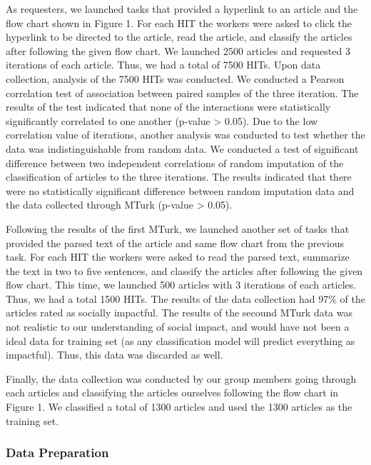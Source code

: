 \documentclass[10pt,letterpaper]{article}
\begin{document}
As requesters, we launched tasks that provided a hyperlink to an article
and the flow chart shown in Figure 1. For each HIT the workers were
asked to click the hyperlink to be directed to the article, read the
article, and classify the articles after following the given flow chart.
We launched 2500 articles and requested 3 iterations of each article.
Thus, we had a total of 7500 HITs. Upon data collection, analysis of the
7500 HITs was conducted. We conducted a Pearson correlation test of
association between paired samples of the three iteration. The results
of the test indicated that none of the interactions were statistically
significantly correlated to one another (p-value \textgreater{} 0.05).
Due to the low correlation value of iterations, another analysis was
conducted to test whether the data was indistinguishable from random
data. We conducted a test of significant difference between two
independent correlations of random imputation of the classification of
articles to the three iterations. The results indicated that there were
no statistically significant difference between random imputation data
and the data collected through MTurk (p-value \textgreater{} 0.05).

Following the results of the first MTurk, we launched another set of
tasks that provided the parsed text of the article and same flow chart
from the previous task. For each HIT the workers were asked to read the
parsed text, summarize the text in two to five sentences, and classify
the articles after following the given flow chart. This time, we
launched 500 articles with 3 iterations of each articles. Thus, we had a
total 1500 HITs. The results of the data collection had 97\% of the
articles rated as socially impactful. The results of the secound MTurk
data was not realistic to our understanding of social impact, and would
have not been a ideal data for training set (as any classification model
will predict everything as impactful). Thus, this data was discarded as
well.

Finally, the data collection was conducted by our group members going
through each articles and classifying the articles ourselves following
the flow chart in Figure 1. We classified a total of 1300 articles and
used the 1300 articles as the training set.

\hypertarget{data-preparation}{%
\subsubsection{Data Preparation}\label{data-preparation}}
\end{document}
